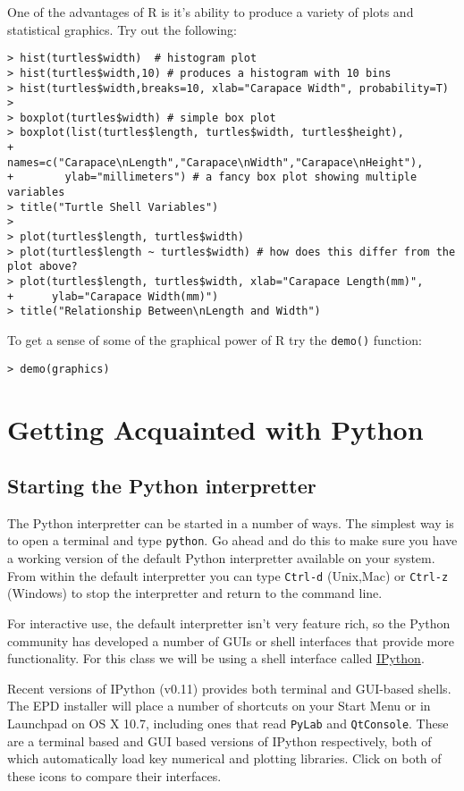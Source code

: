 One of the advantages of R is it's ability to produce a variety of plots
and statistical graphics. Try out the following:

\begin{lstlisting}
> hist(turtles$width)  # histogram plot
> hist(turtles$width,10) # produces a histogram with 10 bins
> hist(turtles$width,breaks=10, xlab="Carapace Width", probability=T)
>
> boxplot(turtles$width) # simple box plot
> boxplot(list(turtles$length, turtles$width, turtles$height),
+        names=c("Carapace\nLength","Carapace\nWidth","Carapace\nHeight"),
+        ylab="millimeters") # a fancy box plot showing multiple variables
> title("Turtle Shell Variables")
>
> plot(turtles$length, turtles$width)
> plot(turtles$length ~ turtles$width) # how does this differ from the plot above?
> plot(turtles$length, turtles$width, xlab="Carapace Length(mm)",
+      ylab="Carapace Width(mm)")
> title("Relationship Between\nLength and Width")
\end{lstlisting}
To get a sense of some of the graphical power of R try the
\lstinline!demo()! function:

\begin{lstlisting}
> demo(graphics)
\end{lstlisting}
\section{Getting Acquainted with Python}

\subsection{Starting the Python interpretter}

The Python interpretter can be started in a number of ways. The simplest
way is to open a terminal and type \lstinline!python!. Go ahead and do
this to make sure you have a working version of the default Python
interpretter available on your system. From within the default
interpretter you can type \lstinline!Ctrl-d! (Unix,Mac) or
\lstinline!Ctrl-z! (Windows) to stop the interpretter and return to the
command line.

For interactive use, the default interpretter isn't very feature rich,
so the Python community has developed a number of GUIs or shell
interfaces that provide more functionality. For this class we will be
using a shell interface called \href{http://ipython.org/}{IPython}.

Recent versions of IPython (v0.11) provides both terminal and GUI-based
shells. The EPD installer will place a number of shortcuts on your Start
Menu or in Launchpad on OS X 10.7, including ones that read
\lstinline!PyLab! and \lstinline!QtConsole!. These are a terminal based
and GUI based versions of IPython respectively, both of which
automatically load key numerical and plotting libraries. Click on both
of these icons to compare their interfaces.

